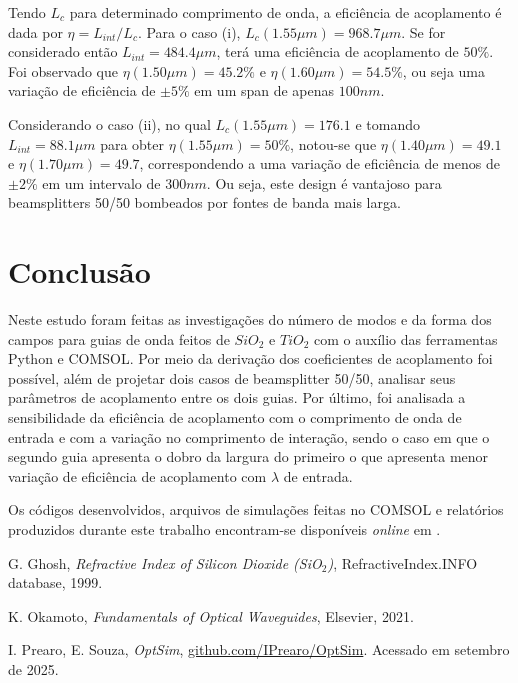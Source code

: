 \documentclass[final,12pt,times,twocolumn]{elsarticle}
\begin{document}
Tendo $L_c$ para determinado comprimento de onda, a eficiência de acoplamento é dada por $\eta = L_{int} / L_c$. Para o caso (i), $L_c(1.55\mu m) = 968.7\mu m$. Se for considerado então $L_{int} = 484.4\mu m$, terá uma eficiência de acoplamento de $50\%$. Foi observado que $\eta(1.50\mu m) = 45.2\%$ e $\eta(1.60\mu m) = 54.5\%$, ou seja uma variação de eficiência de $\pm 5\%$ em um span de apenas $100nm$.

Considerando o caso (ii), no qual $L_c(1.55\mu m) = 176.1$ e tomando $L_{int} = 88.1 \mu m$ para obter $\eta(1.55\mu m) = 50\%$, notou-se que $\eta(1.40\mu m) = 49.1$ e $\eta(1.70\mu m) = 49.7$, correspondendo a uma variação de eficiência de menos de $\pm 2\%$ em um intervalo de $300nm$. Ou seja, este design é vantajoso para beamsplitters 50/50 bombeados por fontes de banda mais larga. 

\section{Conclusão}
\label{sec:conclusion}

Neste estudo foram feitas as investigações do número de modos e da forma dos campos para guias de onda feitos de $SiO_2$ e $TiO_2$ com o auxílio das ferramentas Python e COMSOL. Por meio da derivação dos coeficientes de acoplamento foi possível, além de projetar dois casos de beamsplitter 50/50, analisar seus parâmetros de acoplamento entre os dois guias. Por último, foi analisada a sensibilidade da eficiência de acoplamento com o comprimento de onda de entrada e com a variação no comprimento de interação, sendo o caso em que o segundo guia apresenta o dobro da largura do primeiro o que apresenta menor variação de eficiência de acoplamento com $\lambda$ de entrada.

Os códigos desenvolvidos, arquivos de simulações feitas no COMSOL e relatórios produzidos durante este trabalho encontram-se disponíveis \textit{online} em \cite{github}.

\begin{thebibliography}{99}


G. Ghosh, \textit{Refractive Index of Silicon Dioxide (SiO$_2$)}, RefractiveIndex.INFO database, 1999.

K. Okamoto, \textit{Fundamentals of Optical Waveguides}, Elsevier, 2021.

I. Prearo, E. Souza, \textit{OptSim}, \url{github.com/IPrearo/OptSim}. Acessado em setembro de 2025.

\end{thebibliography}
\end{document}
